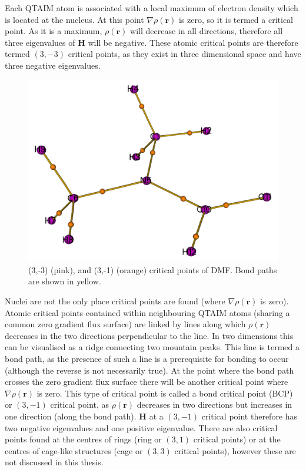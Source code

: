 \begin{refsection}
Each QTAIM atom is associated with a local maximum of electron density which is located at the nucleus.
At this point $\nabla\rho(\textbf{r})$ is zero, so it is termed a critical point.
As it is a maximum, $\rho(\textbf{r})$ will decrease in all directions, therefore all three eigenvalues of $\mathbf{H}$ will be negative.
These atomic critical points are therefore termed $(3,-3)$ critical points, as they exist in three dimensional space and have three negative eigenvalues.

\begin{figure}
    \includegraphics[width=0.45\linewidth]{Figures/dmf-cp.pdf}
    \caption[Critical points of DMF.]{(3,-3) (pink), and (3,-1) (orange) critical points of DMF. Bond paths are shown in yellow.}
    \label{fig:dmf-cps}
\end{figure}

Nuclei are not the only place critical points are found (where $\nabla\rho(\textbf{r})$ is zero).
Atomic critical points contained within neighbouring QTAIM atoms (sharing a common zero gradient flux surface) are linked by lines along which $\rho(\textbf{r})$ decreases in the two directions perpendicular to the line.
In two dimensions this can be visualised as a ridge connecting two mountain peaks.
This line is termed a bond path, as the presence of such a line is a prerequisite for bonding to occur (although the reverse is not necessarily true).
At the point where the bond path crosses the zero gradient flux surface there will be another critical point where $\nabla\rho(\textbf{r})$ is zero.
This type of critical point is called a bond critical point (BCP) or $(3,-1)$ critical point, as $\rho(\textbf{r})$ decreases in two directions but increases in one direction (along the bond path).
$\mathbf{H}$ at a $(3,-1)$ critical point therefore has two negative eigenvalues and one positive eigenvalue.
There are also critical points found at the centres of rings (ring or $(3,1)$ critical points) or at the centres of cage-like structures (cage or $(3,3)$ critical points), however these are not discussed in this thesis.


\end{refsection}
